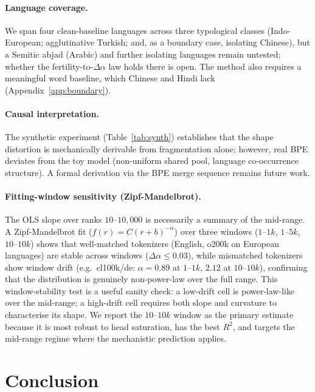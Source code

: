 \documentclass{article}
\begin{document}
\paragraph{Language coverage.} We span four clean-baseline languages across three
typological classes (Indo-European; agglutinative Turkish; and, as a boundary case,
isolating Chinese), but a Semitic abjad (Arabic) and further isolating languages remain
untested; whether the fertility-to-$\Delta\alpha$ law holds there is open. The method also
requires a meaningful word baseline, which Chinese and Hindi lack
(Appendix~\ref{app:boundary}).

\paragraph{Causal interpretation.} The synthetic experiment (Table~\ref{tab:synth})
establishes that the shape distortion is mechanically derivable from fragmentation
alone; however, real BPE deviates from the toy model (non-uniform shared pool, language
co-occurrence structure). A formal derivation via the BPE merge sequence remains future work.

\paragraph{Fitting-window sensitivity (Zipf-Mandelbrot).} The OLS slope over ranks
$10$--$10{,}000$ is necessarily a summary of the mid-range. A Zipf-Mandelbrot fit
($f(r) = C(r+b)^{-\alpha}$) over three windows ($1$--$1k$, $1$--$5k$, $10$--$10k$)
shows that well-matched tokenizers (English, o200k on European languages) are stable
across windows ($\Delta\alpha \leq 0.03$), while mismatched tokenizers show window drift
(e.g.\ cl100k/de: $\alpha = 0.89$ at $1$--$1k$, $2.12$ at $10$--$10k$), confirming
that the distribution is genuinely non-power-law over the full range. This
window-stability test is a useful sanity check: a low-drift cell is power-law-like
over the mid-range; a high-drift cell requires both slope and curvature to characterise
its shape. We report the $10$--$10k$ window as the primary estimate because it is
most robust to head saturation, has the best $R^2$, and targets the mid-range regime
where the mechanistic prediction applies.


\section{Conclusion}
\label{sec:conclusion}
\end{document}
